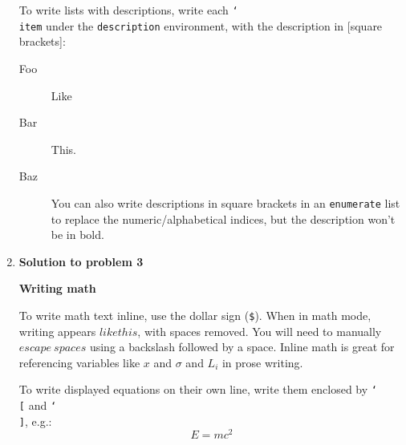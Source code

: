 \documentclass[11pt]{article}
\newcommand{\problemitem}[1]{
  \bigskip
  \item {\bf Solution to problem #1}
  \medskip
}
\newcommand{\BACKSLASH}{\char`\\ }
\begin{document}
\begin{enumerate}
To write lists with descriptions, write each \texttt{\BACKSLASH item} under the
\texttt{description} environment, with the description in [square brackets]:
\begin{description}
  \item[Foo] Like
  \item[Bar] This.
  \item[Baz]
    You can also write descriptions in square brackets in an
    \texttt{enumerate} list to replace the numeric/alphabetical indices, but the
    description won't be in bold.
\end{description}

\problemitem{3}

{\large \textbf{Writing math}}

To write math text inline, use the dollar sign (\texttt{\$}).  When in math
mode, writing appears $like this$, with spaces removed.  You will need to
manually $escape\ spaces$ using a backslash followed by a space. Inline math is
great for referencing variables like $x$ and $\sigma$ and $L_i$ in prose
writing.

To write displayed equations on their own line, write them enclosed by
\texttt{\BACKSLASH[} and \texttt{\BACKSLASH]}, e.g.:
\[
  E = mc^2
\]


\end{enumerate}
\end{document}
